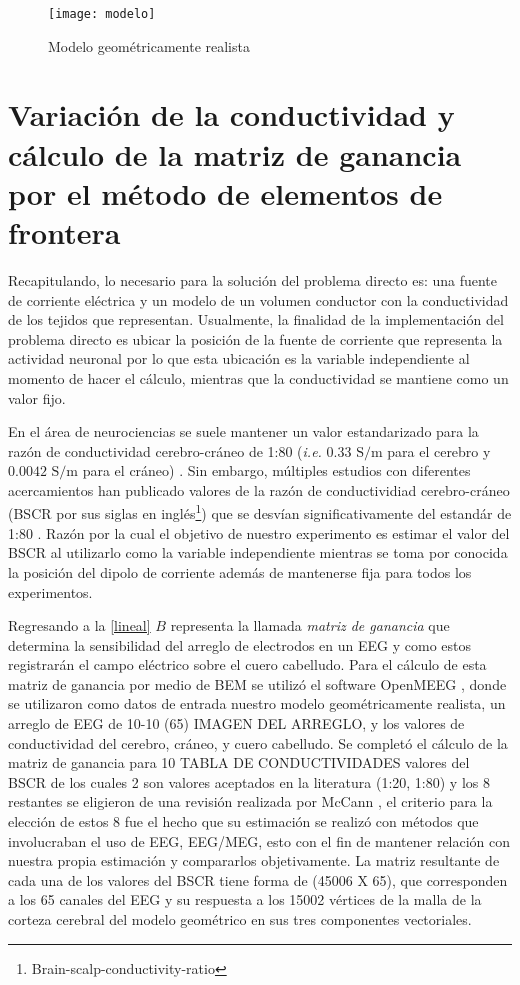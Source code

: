 \begin{figure}[htb]
	\texttt{[image: modelo]}
	\caption{Modelo geométricamente realista}
	\label{fig:methodology:model}
\end{figure}




\section{Variación de la conductividad y cálculo de la matriz de ganancia por el método de elementos de frontera}
\label{sec:methodology:openmeeg}

Recapitulando, lo necesario para la solución del problema directo es: una fuente de corriente eléctrica y un modelo de un volumen conductor con la conductividad de los tejidos que representan. Usualmente, la finalidad de la implementación del problema directo es ubicar la posición de la fuente de corriente que representa la actividad neuronal por lo que esta ubicación es la variable independiente al momento de hacer el cálculo, mientras que la conductividad se mantiene como un valor fijo. 

En el área de neurociencias se suele mantener un valor estandarizado para la razón de conductividad cerebro-cráneo de 1:80 (\emph{i.e.} $0.33\text{ S/m}$ para el cerebro y $0.0042 \text{ S/m}$ para el cráneo) \cite{Rush1968,Rush1969,Cohen1983}. Sin embargo, múltiples estudios con diferentes acercamientos han publicado valores de la razón de conductividiad cerebro-cráneo (BSCR por sus siglas en inglés\footnote{Brain-scalp-conductivity-ratio}) que se desvían significativamente del estandár de 1:80 \cite{McCann2019}. Razón por la cual el objetivo de nuestro experimento es estimar el valor del BSCR al utilizarlo como la variable independiente mientras se toma por conocida la posición del dipolo de corriente además de mantenerse fija para todos los experimentos.

Regresando a la \cref{lineal} $B$ representa la llamada \emph{matriz de ganancia} que determina la sensibilidad del arreglo de electrodos en un EEG y como estos registrarán el campo eléctrico sobre el cuero cabelludo. Para el cálculo de esta matriz de ganancia por medio de BEM se utilizó el software OpenMEEG \cite{open,open2}, donde se utilizaron como datos de entrada nuestro modelo geométricamente realista, un arreglo de EEG de 10-10 (65) IMAGEN DEL ARREGLO, y los valores de conductividad del cerebro, cráneo, y cuero cabelludo. Se completó el cálculo de la matriz de ganancia para 10 TABLA DE CONDUCTIVIDADES valores del BSCR de los cuales 2 son valores aceptados en la literatura (1:20, 1:80) y los 8 restantes se eligieron de una revisión realizada por McCann \cite{McCann2019}, el criterio para la elección de estos 8 fue el hecho que su estimación se realizó con métodos que involucraban el uso de EEG, EEG/MEG, esto con el fin de mantener relación con nuestra propia estimación y compararlos objetivamente. La matriz resultante de cada una de los valores del BSCR tiene forma de (45006 X 65), que corresponden a los 65 canales del EEG y su respuesta a los 15002 vértices de la malla de la corteza cerebral del modelo geométrico en sus tres componentes vectoriales.

